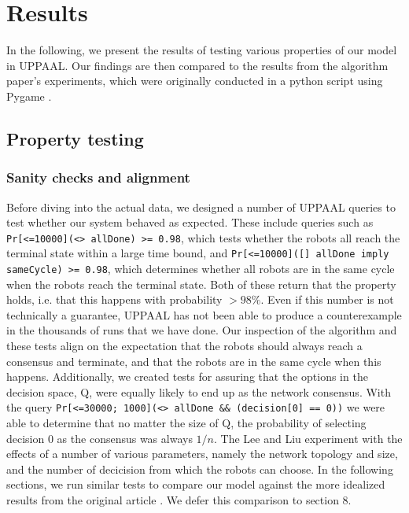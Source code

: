 \section{Results}
In the following, we present the results of testing various properties of our model in UPPAAL. Our findings are then compared to the results from the algorithm paper's experiments, which were originally conducted in a python script using Pygame \parencite{AlgorithmPaper}.

\subsection{Property testing}
\subsubsection{Sanity checks and alignment}
Before diving into the actual data, we designed a number of UPPAAL queries to test whether our system behaved as expected. These include queries such as \texttt{Pr[<=10000](<> allDone) >= 0.98}, which tests whether the robots all reach the terminal state within a large time bound, and \texttt{Pr[<=10000]([] allDone imply sameCycle) >= 0.98}, which determines whether all robots are in the same cycle when the robots reach the terminal state. Both of these return that the property holds, i.e. that this happens with probability $>98\%$. Even if this number is not technically a guarantee, UPPAAL has not been able to produce a counterexample in the thousands of runs that we have done. Our inspection of the algorithm and these tests align on the expectation that the robots should always reach a consensus and terminate, and that the robots are in the same cycle when this happens. Additionally, we created tests for assuring that the options in the decision space, Q, were equally likely to end up as the network consensus. With the query \texttt{Pr[<=30000; 1000](<> allDone \&\& (decision[0] == 0))} we were able to determine that no matter the size of Q, the probability of selecting decision 0 as the consensus was always $1/n$.
\newline
\newline
The Lee and Liu experiment with the effects of a number of various parameters, namely the network topology and size, and the number of decicision from which the robots can choose. In the following sections, we run similar tests to compare our model against the more idealized results from the original article \parencite{AlgorithmPaper}. We defer this comparison to section 8.


